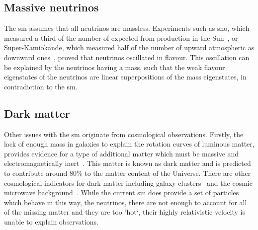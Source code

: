 \subsection{Massive neutrinos} %
\label{sub:massive_neutrinos}

The \acrshort{sm} assumes that all neutrinos are massless.
Experiments such as \acrshort{sno}, which measured a third of the number of \nue{} expected from production in the Sun~\cite{Th:SNO}, or Super-Kamiokande, which measured half of the number of upward atmospheric \numu{} as downward ones~\cite{Th:SuperK}, proved that neutrinos oscillated in flavour.
This oscillation can be explained by the neutrinos having a mass, such that the weak flavour eigenstates of the neutrinos are linear superpositions of the mass eigenstates, in contradiction to the \acrshort{sm}.


\subsection{Dark matter} %
\label{sub:dark_matter}

Other issues with the \acrshort{sm} originate from cosmological observations.
Firstly, the lack of enough mass in galaxies to explain the rotation curves of luminous matter, provides evidence for a type of additional matter which must be massive and electromagnetically inert~\cite{Th:DM1}.
This matter is known as dark matter and is predicted to contribute around 80\% to the matter content of the Universe. 
There are other cosmological indicators for dark matter including galaxy clusters~\cite{Th:DM2} and the cosmic microwave background~\cite{Th:DM3}.
While the current \acrshort{sm} does provide a set of particles which behave in this way, the neutrinos, there are not enough to account for all of the missing matter and they are too 'hot`, \ie{} their highly relativistic velocity is unable to explain observations.

